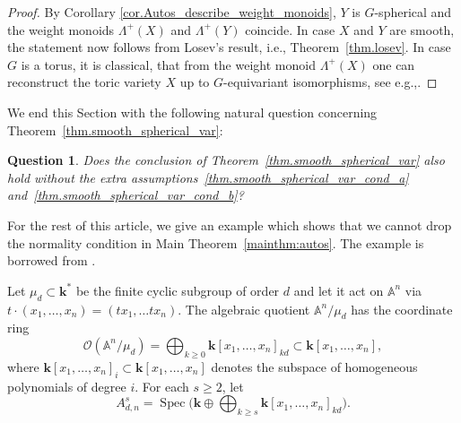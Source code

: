 \documentclass[11pt]{article}
\makeatletter
\newcommand{\ie}{i.e.,\xspace}
\newcommand{\eg}{e.g.,\xspace}
\numberwithin{equation}{section}
\let\mathcal\mathscr
\theoremstyle{plain}
\newtheorem{question}[theorem]{Question}
\theoremstyle{definition}
\DeclareMathOperator{\Spec}{Spec}
\newcommand{\kk}{{\boldsymbol{k}}}
\newcommand{\name}[1]{#1}
\renewcommand\section{\@startsection{section}{1}{\z@}{-3.5ex \@plus -1ex \@minus -.2ex}{2.3ex \@plus .2ex}{\normalfont\large\bfseries}}
\makeatother
\begin{document}
\begin{proof}
By Corollary \ref{cor.Autos_describe_weight_monoids}, $Y$ is $G$-spherical
and the weight monoids
$\Lambda^+(X)$ and $\Lambda^+(Y)$ coincide.
In case $X$ and $Y$ are smooth, the statement now follows from
\name{Losev}'s result, \ie Theorem~\ref{thm.losev}.
In case $G$ is a torus, it is classical, that from the weight monoid $\Lambda^+(X)$
one can reconstruct the toric variety $X$ up to $G$-equivariant isomorphisms,
see \eg \cite[\S1.3]{Fu1993Introduction-to-to}.
\end{proof}

We end this Section with the following natural question concerning
Theorem~\ref{thm.smooth_spherical_var}:

\begin{question}
Does the conclusion of Theorem~\ref{thm.smooth_spherical_var} also hold without
the extra assumptions~\eqref{thm.smooth_spherical_var_cond_a} and~\eqref{thm.smooth_spherical_var_cond_b}?
\end{question}

\section{A counterexample}
\label{sec.Counter_example}

For the rest of this article, we give an example which shows that we cannot drop the normality condition
in Main Theorem~\ref{mainthm:autos}. The example is borrowed from \cite{Re2017Characterization-o}.

Let $\mu_d \subset \kk^\ast$ be the
finite cyclic subgroup of order $d$ and let it act on $\mathbb{A}^n$ via
$t \cdot (x_1, \ldots, x_n) = (t x_1, \ldots t x_n)$. The algebraic quotient
$\mathbb{A}^n/\mu_d$ has the coordinate ring
\[
\mathcal{O}(\mathbb{A}^n/\mu_d) = \bigoplus_{k \ge 0} \kk[x_1,\dots,x_n]_{kd}
\subset \kk[x_1, \ldots, x_n],
\]
where
$\kk[x_1,\dots,x_n]_{i} \subset \kk[x_1, \ldots, x_n]$
denotes the subspace of homogeneous polynomials of degree $i$. For each $s \geq 2$, let
\[
A_{d, n}^s = \Spec\biggl(\kk \oplus \bigoplus_{k \ge s} \kk[x_1,\dots,x_n]_{kd} \biggr).
\]
\end{document}
